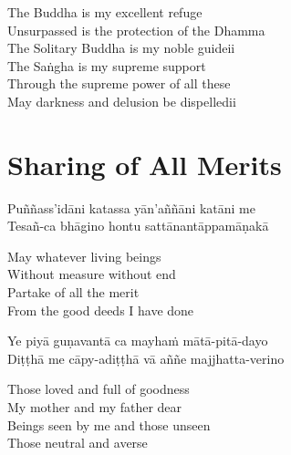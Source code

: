 \begin{english}
  The Buddha is my excellent refuge\\
  Unsurpassed is the protection of the Dhamma\\
  The Solitary Buddha is my noble guideii\\
  The Saṅgha is my supreme support\\
  Through the supreme power of all these\\
  May darkness and delusion be dispelledii
\end{english}

\suttaRef{[Trad]}


\section{Sharing of All Merits}
\label{sharing-all-merits}

\begin{leader}
\end{leader}

Puññass'idāni katassa yān'aññāni katāni me\\
Tesañ-ca bhāgino hontu sattānantāppamāṇakā

\begin{english}
  May whatever living beings\\
  Without measure without end\\
  Partake of all the merit\\
  From the good deeds I have done
\end{english}

Ye piyā guṇavantā ca mayhaṁ mātā-pitā-dayo\\
Diṭṭhā me cāpy-adiṭṭhā vā aññe majjhatta-verino

\begin{english}
  Those loved and full of goodness\\
  My mother and my father dear\\
  Beings seen by me and those unseen\\
  Those neutral and averse
\end{english}

